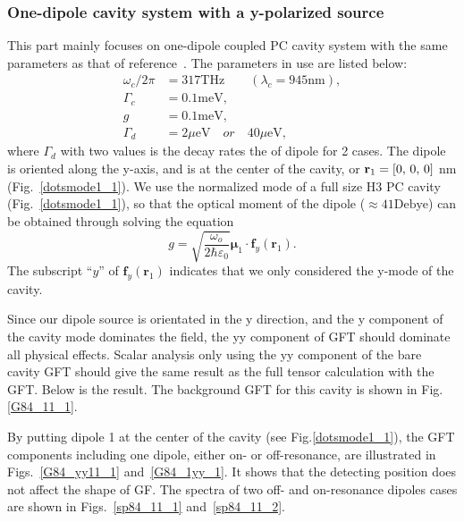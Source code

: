 \subsubsection{One-dipole cavity system with a y-polarized source}
This part mainly focuses on one-dipole coupled PC cavity system with the same parameters as that of reference~\cite{Hughes2009}.
The parameters in use are listed below:
\begin{align}
 \omega_c/2\pi &= 317 {\text {THz}}\quad \quad (\lambda_c=945 {\text {nm}}),\\
 \Gamma_c &= 0.1 {\text {meV}}, \\
 g &= 0.1 {\text {meV}}, \\
 \Gamma_{d} &= 2 \mu{\text {eV}}
 \quad or\quad 40 \mu{\text {eV}},
\nonumber
\end{align}
where $\Gamma_{d}$ with two values is the decay rates the of dipole for 2 cases. The dipole is oriented along the y-axis, and is at the center of the cavity, or $\mathbf{r}_1=[0,\,0,\,0]$ nm (Fig.~\ref{dotsmode1_1}). We use the normalized mode of a full size H3 PC cavity~\cite{Hughes2009} (Fig.~\ref{dotsmode1_1}), so that the optical moment of the dipole ($\approx 41 \text{Debye}$) can be obtained through solving the equation
\begin{equation}\label{eq:g1}
g=\sqrt{\frac{\omega_o}{2\hbar \varepsilon_0}}\boldsymbol{\mu}_{1}\cdot \mathbf{f}_y(\mathbf{r}_{1}).
\end{equation}
The subscript ``$y$'' of $\mathbf{f}_y(\mathbf{r}_{1})$ indicates that we only considered the y-mode of the cavity.

Since our dipole source is orientated in the y direction, and the y component of the cavity mode dominates the field, the yy component of GFT should dominate all physical effects. Scalar analysis only using the yy component of the bare cavity GFT should give the same result as the full tensor calculation with the GFT. Below is the result. The background GFT for this cavity is shown in Fig.\ref{G84_11_1}.

By putting dipole 1 at the center of the cavity (see Fig.\ref{dotsmode1_1}), the GFT components including one dipole, either on- or off-resonance, are illustrated in Figs.~\ref{G84_yy11_1} and~\ref{G84_1yy_1}. It shows that the detecting position does not affect the shape of GF. The spectra of two off- and on-resonance dipoles cases are shown in Figs.~\ref{sp84_11_1} and~\ref{sp84_11_2}.

